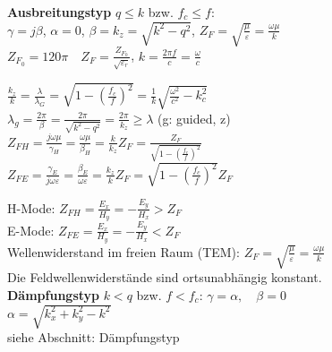 \documentclass[english]{latex4ei/latex4ei_sheet}
\begin{document}
\begin{sectionbox}
	\textbf{Ausbreitungstyp} $q\leq k$ bzw. $f_c \leq f$:\\
	$\gamma = j\beta$, $\alpha=0$, $\beta = k_z = \sqrt{k^2 - q^2}$, $Z_F = \sqrt{\frac{\mu}{\varepsilon}} = \frac{\omega\mu}{k}$\\
	$Z_{F_0} = 120\pi \quad Z_F = \frac{Z_{F_0}}{\sqrt{\varepsilon_r}}$, 
	$k=\frac{2 \pi f}{c}= \frac{\omega}{c}$ 
	\begin{emphbox}
		$\frac{k_z}{k} = \frac{\lambda}{\lambda_G} = \sqrt{1- \left(\frac{f_c}{f}\right)^2}=\frac{1}{k}\sqrt{\frac{\omega^{2}}{c^{2}}-k_{c}^{2}}$\\
		$\lambda_{g}=\frac{2 \pi}{\beta}=\frac{2 \pi}{\sqrt{k^{2}-q^{2}}} =\frac{2 \pi}{k_z}\geq \lambda$ (g: guided, z)\\
		$Z_{F H} = \frac{j \omega \mu}{\gamma_{H}}=\frac{\omega \mu}{\beta_{H}}=\frac{k}{k_z}Z_F=\frac{Z_{F}}{\sqrt{1 - \left(\frac{f_c}{f}\right)^2}}$\\
		$Z_{F E} = \frac{\gamma_{E}}{j \omega \varepsilon}=\frac{\beta_{E}}{\omega \varepsilon}=\frac{k_z}{k}Z_F=\sqrt{1 - \left(\frac{f_c}{f}\right)^2}Z_{F}$\\
	\end{emphbox}
	H-Mode: $Z_{F H} = \frac{E_x}{H_y} = -\frac{E_y}{H_x} > Z_F$\\
	E-Mode: $Z_{F E} = \frac{E_x}{H_y} = -\frac{E_y}{H_x} < Z_F$\\
	Wellenwiderstand im freien Raum (TEM): $Z_F = \sqrt{\frac{\mu}{\varepsilon}} = \frac{\omega\mu}{k}$\\
	Die Feldwellenwiderstände sind ortsunabhängig konstant.\\

	\textbf{Dämpfungstyp} $k < q$ bzw. $f < f_c$: $\gamma = \alpha, \quad \beta=0$\\
	$\alpha=\sqrt{k_{x}^{2}+k_{y}^{2}-k^{2}}$\\
	siehe Abschnitt: Dämpfungstyp


\end{sectionbox}
\end{document}
